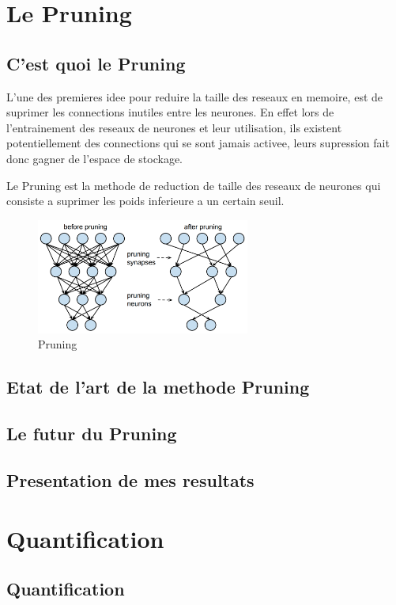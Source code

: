 \documentclass[twoside,twocolumn]{article}
\begin{document}
\section{Le Pruning} %

\subsection{C'est quoi le Pruning}
L'une des premieres idee pour reduire la taille des reseaux en memoire, est de suprimer les connections inutiles entre les neurones.
En effet lors de l'entrainement des reseaux de neurones et leur utilisation, ils existent potentiellement des connections qui se sont jamais 
activee, leurs supression  fait donc gagner de l'espace de stockage.

Le Pruning est la methode de reduction de taille des reseaux de neurones qui consiste a suprimer les poids inferieure a un certain seuil.

\begin{figure}[h]
  \centering
  \includegraphics[width=70mm]{pruning.png}
  \caption{Pruning}
  \label{pruning}
\end{figure}

\subsection{Etat de l'art de la methode Pruning}
\subsection{Le futur du Pruning}
\subsection{Presentation de mes resultats}

\section{Quantification}%
\subsection{Quantification}
\end{document}
